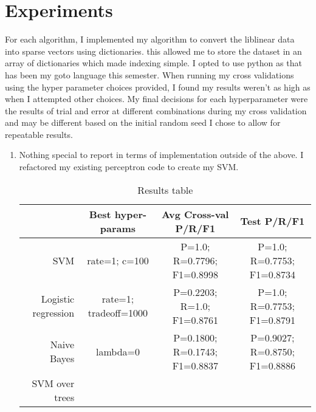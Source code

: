 \documentclass[11pt,a4paper]{article}
\begin{document}
	\section{Experiments}
		For each algorithm, I implemented my algorithm to convert the liblinear data into sparse vectors using dictionaries. this allowed me to store the dataset in an array of dictionaries which made indexing simple. I opted to use python as that has been my goto language this semester. When running my cross validations using the hyper parameter choices provided, I found my results weren't as high as when I attempted other choices. My final decisions for each hyperparameter were the results of trial and error at different combinations during my cross validation and may be different based on the initial random seed I chose to allow for repeatable results.
		\begin{enumerate}
			\item Nothing special to report in terms of implementation outside of the above. I refactored my existing perceptron code to create my SVM.
			\begin{table}[]
    \centering
    \scriptsize
    \begin{tabular}{rccc}
      \toprule 
                          &   Best hyper-params   &       Avg Cross-val P/R/F1      & Test P/R/F1 \\\midrule
      SVM                 &    rate=1; c=100      &    P=1.0; R=0.7796; F1=0.8998   &  P=1.0; R=0.7753; F1=0.8734       \\
      Logistic regression & rate=1; tradeoff=1000 &    P=0.2203; R=1.0; F1=0.8761   &  P=1.0; R=0.7753; F1=0.8791        \\
      Naive Bayes         &      lambda=0         &    P=0.1800; R=0.1743; F1=0.8837&  P=0.9027; R=0.8750; F1=0.8886      \\
      SVM over trees      &                       &                                 &             \\
      \bottomrule
    \end{tabular}
    \caption{Results table}\label{tb}
  \end{table}
		\end{enumerate}
	
\end{document}

